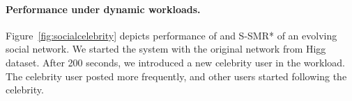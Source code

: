 


\paragraph*{Performance under dynamic workloads.}

Figure~\ref{fig:socialcelebrity} depicts performance of \dynastar and S-SMR* of an evolving social network.  
We started the system with the original network from Higg dataset. After 200 seconds, we introduced a new celebrity user in the workload.
The celebrity user posted more frequently, and 
other users started following the celebrity. 

